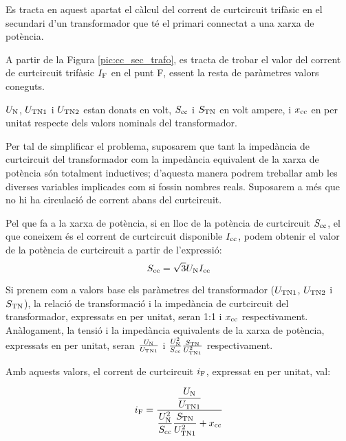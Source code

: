  Es tracta en aquest apartat el càlcul del corrent de curtcircuit trifàsic en el secundari d'un transformador que té el
primari connectat  a una xarxa de potència.

A partir de la Figura \vref{pic:cc_sec_trafo}, es tracta de trobar
el valor del corrent de curtcircuit trifàsic $I_\mathrm{F}$ en el punt
F, essent la resta de paràmetres valors coneguts.

\begin{center}
    
     \label{pic:cc_sec_trafo}
\end{center}

$U_\mathrm{N}$, $U_\mathrm{TN1}$ i $U_\mathrm{TN2}$ estan donats en volt,
$S_\mathrm{cc}$ i $S_\mathrm{TN}$ en volt ampere, i $x_\mathrm{cc}$ en per unitat
respecte dels valors nominals del transformador.


Per tal de simplificar el problema, suposarem que tant la impedància
de curtcircuit del transformador com la impedància equivalent de
la xarxa de potència són totalment inductives; d'aquesta manera
podrem treballar amb les diverses variables implicades com si
fossin nombres reals. Suposarem a més que no hi ha circulació de
corrent abans del curtcircuit.

Pel que fa a la xarxa de potència, si en lloc de la potència de curtcircuit $S_\mathrm{cc}$, el que coneixem és el corrent de curtcircuit
disponible $I_\mathrm{cc}$, podem obtenir el valor de la potència de
curtcircuit a partir de l'expressió:
\begin{equation}
    S_\mathrm{cc} = \sqrt{3} U_\mathrm{N} I_\mathrm{cc}
\end{equation}

 Si prenem com a valors base els
paràmetres del transformador ($U_\mathrm{TN1}$, $U_\mathrm{TN2}$ i
$S_\mathrm{TN}$), la relació de transformació i la impedància de curtcircuit del transformador, expressats en per unitat, seran 1:1 i
$x_\mathrm{cc}$ respectivament. Anàlogament, la tensió i la impedància
equivalents de la xarxa de potència, expressats en per unitat, seran
$\frac{U_\mathrm{N}}{U_\mathrm{TN1}}$ i $\frac{U_\mathrm{N}^2}{S_\mathrm{cc}}
\frac{S_\mathrm{TN}}{U_\mathrm{TN1}^2}$ respectivament.

Amb aquests valors, el corrent de curtcircuit $i_\mathrm{F}$, expressat
en per unitat, val:

\begin{equation}
    i_\mathrm{F} = \frac{\dfrac{U_\mathrm{N}}{U_\mathrm{TN1}}}{\dfrac{U_\mathrm{N}^2}{S_\mathrm{cc}}
    \dfrac{S_\mathrm{TN}}{U_\mathrm{TN1}^2} + x_\mathrm{cc}}
\end{equation}

